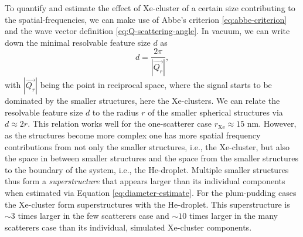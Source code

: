 %
To quantify and estimate the effect of Xe-cluster of a certain size contributing to the spatial-frequencies, we can make use of Abbe's criterion \eqref{eq:abbe-criterion} and the wave vector definition \eqref{eq:Q-scattering-angle}. In vacuum, we can write down the minimal resolvable feature size $d$ as
\begin{equation}
d = \frac{2\pi}{\left|\vec{Q_{r}}\right|},
\label{eq:diameter-estimate}
\end{equation}
with $\left|\vec{Q_{r}}\right|$ being the point in reciprocal space, where the signal starts to be dominated by the smaller structures, here the Xe-clusters. We can relate the resolvable feature size $d$ to the radius $r$ of the smaller spherical structures via $d\approx 2 r$. This relation works well for the one-scatterer case $r_{\text{Xe}}\approx 15$ nm. However, as the structures become more complex one has more spatial frequency contributions from not only the smaller structures, i.e., the Xe-cluster, but also the space in between smaller structures and the space from the smaller structures to the boundary of the system, i.e., the He-droplet. Multiple smaller structures thus form a \textit{superstructure} that appears larger than its individual components when estimated via Equation \eqref{eq:diameter-estimate}. For the plum-pudding cases the Xe-cluster form superstructures with the He-droplet. This superstructure is $\sim 3$ times larger in the few scatterers case and $\sim 10$ times larger in the many scatterers case than its individual, simulated Xe-cluster components.\\[1\baselineskip]
